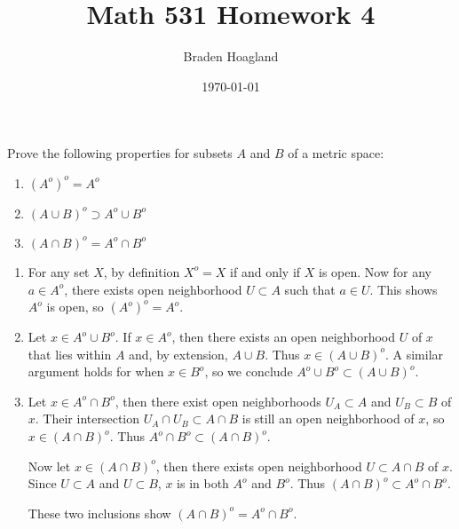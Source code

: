 \documentclass[10pt]{amsart}
\theoremstyle{plain}
\newenvironment{exercise}[1]{%
  \renewcommand\themanualtheoreminner{#1}%
  \manualtheoreminner
}{\endmanualtheoreminner}
\theoremstyle{definition}
\begin{document}
%

\title{Math 531 Homework 4}
\author{Braden Hoagland}


\date{\today}

\maketitle

\begin{exercise}{2.12}
	Prove the following properties for subsets $A$ and $B$ of a metric space:
	\begin{enumerate}
		\item $(A^o)^o = A^o$
		\item $(A \cup B)^o \supset A^o \cup B^o$ 
		\item $(A \cap B)^o = A^o \cap B^o$
	\end{enumerate}
	\hrulefill
\end{exercise}
\begin{enumerate}
	\item
		For any set $X$, by definition $X^o = X$ if and only if $X$ is open. Now for any $a \in A^o$, there exists open neighborhood $U \subset A$ such that $a \in U$. This shows $A^o$ is open, so $(A^o)^o = A^o$.

	\item
		Let $x \in A^o \cup B^o$. If $x \in A^o$, then there exists an open neighborhood $U$ of $x$ that lies within $A$ and, by extension, $A \cup B$. Thus $x \in (A \cup B)^o$. A similar argument holds for when $x \in B^o $, so we conclude $A^o \cup B^o \subset (A \cup B)^o$.

	\item 
		Let $x \in A^o \cap B^o$, then there exist open neighborhoods $U_A \subset A$ and $U_B \subset B $ of $x$. Their intersection $U_A \cap U_B \subset A \cap B$ is still an open neighborhood of $x$, so $x \in (A \cap B)^o$. Thus $A^o \cap B^o \subset (A \cap B)^o$.

		Now let $x \in (A \cap B)^o$, then there exists open neighborhood $U \subset A \cap B$ of $x$. Since $U \subset A$ and $U \subset B$, $x$ is in both $A^o$ and $B^o$. Thus $(A \cap B)^o \subset A^o \cap B^o$.

		These two inclusions show $(A \cap B)^o = A^o \cap B^o$.
\end{enumerate}
\end{document}
